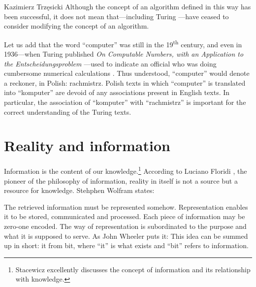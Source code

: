 \begin{artengenv}{Kazimierz Trzęsicki}
Although the concept of an algorithm defined in this way has been successful, it does not mean that---including Turing \parencite*{Turing1950}---have ceased to consider modifying the concept of an algorithm.

Let us add that the word ``computer'' was still in the 19\textsuperscript{th} century, and even in 1936---when Turing published \emph{On Computable Numbers, with an Application to the {E}ntscheidungsproblem} \parencite*{Turing1936}---used to indicate an official who was doing cumbersome numerical calculations \parencite[p.446]{CopelandSprevakShagrir2017}. Thus understood, ``computer'' would denote a reckoner, in Polish: rachmistrz. Polish texts in which ``computer'' is translated into ``komputer'' are devoid of any associations present in English texts. In particular, the association of ``komputer'' with ``rachmistrz'' is important for the correct understanding of the  Turing texts.
\enlargethispage{1.5\baselineskip}



\section{Reality and information} 
Information is the content of our knowledge.\footnote{Stacewicz \parencite*[\S 1]{MarciszewskiStacewicz2011} excellently discusses the concept of information and its relationship with knowledge.}
According to Luciano Floridi \parencite*{Floridi2008}, the pioneer of the philosophy of information, reality in itself is not a source but a resource for knowledge.  Stehphen Wolfram \parencite*[p.389]{Wolfram2002} states:

 The retrieved information must be represented somehow. Representation enables it to be stored, communicated and processed. Each piece of information may be zero-one encoded. The way of representation is subordinated to the purpose and what it is supposed to serve. As John Wheeler \parencite*{Wheeler1989} puts it:  This idea can be summed up in short: it from bit, where ``it'' is what exists and ``bit'' refers to information.


\end{artengenv}

